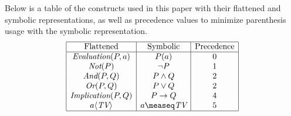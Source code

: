 \documentclass[runningheads]{llncs}
\newcommand{\TEval}{\textit{Evaluation}}
\newcommand{\TList}{\textit{List}}
\newcommand{\TAnd}{\textit{And}}
\newcommand{\TOr}{\textit{Or}}
\newcommand{\TNot}{\textit{Not}}
\newcommand{\TImpl}{\textit{Implication}}
\newcommand{\TTV}{\textit{TV}}
\newcommand{\TBTV}{\langle \TTV \rangle}
\newcommand{\limp}{\rightarrow}
\begin{document}
Below is a table of the constructs used in this paper with their
flattened and symbolic representations, as well as precedence values
to minimize parenthesis usage with the symbolic representation.
\renewcommand{\arraystretch}{1.5}
$$
\begin{array}{|c|c|c|}
  \hline
  \text{Flattened} & \text{Symbolic} & \text{Precedence} \\
  \hline
  \TEval(P, a) & P(a) & 0 \\
  \TNot(P) & \lnot P & 1 \\
  \TAnd(P, Q) & P \land Q & 2 \\
  \TOr(P, Q) & P \lor Q & 2 \\
  \TImpl(P, Q) & P \limp Q & 4 \\
  a \TBTV & a \measeq \TTV & 5 \\
  \hline
\end{array}
$$
\renewcommand{\arraystretch}{1}
\end{document}
